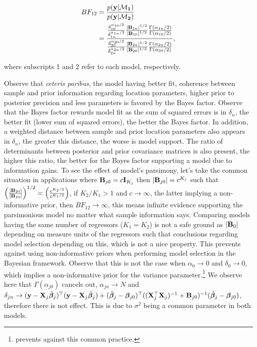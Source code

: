 \begin{align*}
	BF_{12}&=\frac{p(\bf{y}|\mathcal{M}_1)}{p(\bf{y}|\mathcal{M}_2)}\\
	&=\frac{\frac{\delta_{10}^{\alpha_{10}/2}}{\delta_{1n}^{\alpha_{1n}/2}}\frac{|{\bf{B}}_{1n}|^{1/2}}{|{\bf{B}}_{10}|^{1/2}}\frac{\Gamma(\alpha_{1n}/2)}{\Gamma(\alpha_{10}/2)}}{\frac{\delta_{20}^{\alpha_{20}/2}}{\delta_{2n}^{\alpha_{2n}/2}}\frac{|{\bf{B}}_{2n}|^{1/2}}{|{\bf{B}}_{20}|^{1/2}}\frac{\Gamma(\alpha_{2n}/2)}{\Gamma(\alpha_{20}/2)}},
\end{align*}

where subscripts 1 and 2 refer to each model, respectively.

Observe that \textit{ceteris paribus}, the model having better fit, coherence between sample and prior information regarding location parameters, higher prior to posterior precision and less parameters is favored by the Bayes factor. Observe that the Bayes factor rewards model fit as the sum of squared errors is in $\delta_n$, the better fit (lower sum of squared errors), the better the Bayes factor. In addition, a weighted distance between sample and prior location parameters also appears in $\delta_n$, the greater this distance, the worse is model support. The ratio of determinants between posterior and prior covariance matrices is also present, the higher this ratio, the better for the Bayes factor supporting a model due to information gains. To see the effect of model's parsimony, let's take the common situation in applications where ${\bf{B}}_{j0}=c{\bf{I}}_{K_j}$ then $|{\bf{B}}_{j0}|=c^{K_j}$ such that $\left(\frac{|{\bf{B}}_{20}|}{|{\bf{B}}_{10}|}\right)^{1/2}=\left(\frac{c^{K_2/2}}{c^{K_1/2}}\right)$, if $K_2/K_1>1$ and $c\rightarrow\infty$, the latter implying a non-informative prior, then $BF_{12}\rightarrow\infty$, this means infinite evidence supporting the parsimonious model no matter what sample information says. Comparing models having the same number of regressors ($K_1=K_2$) is not a safe ground as $|{\bf{B}}_{0}|$ depending on measure units of the regressors such that conclusions regarding model selection depending on this, which is not a nice property. This prevents against using non-informative priors when performing model selection in the Bayesian framework. Observe that this is not the case when $\alpha_0\rightarrow 0$ and $\delta_0\rightarrow 0$, which implies a non-informative prior for the variance parameter.\footnote{\cite{gelman2006prior} prevents against this common practice.} We observe here that $\Gamma(\alpha_{j0})$ cancels out, $\alpha_{jn} \rightarrow N$ and $\delta_{jn}\rightarrow ({\bf{y}}-{\bf{X}}_j\hat{\bm{\beta}}_j)^{\top}({\bf{y}}-{\bf{X}}_j\hat{\bm{\beta}}_j)+(\hat{\bm{\beta}}_j-\bm{\beta}_{j0})^{\top}(({\bf{X}}_j^{\top}{\bf{X}}_j)^{-1}+{\bf{B}}_{j0})^{-1}(\hat{\bm{\beta}}_j-\bm{\beta}_{j0})$, therefore there is not effect. This is due to $\sigma^2$ being a common parameter in both models.

